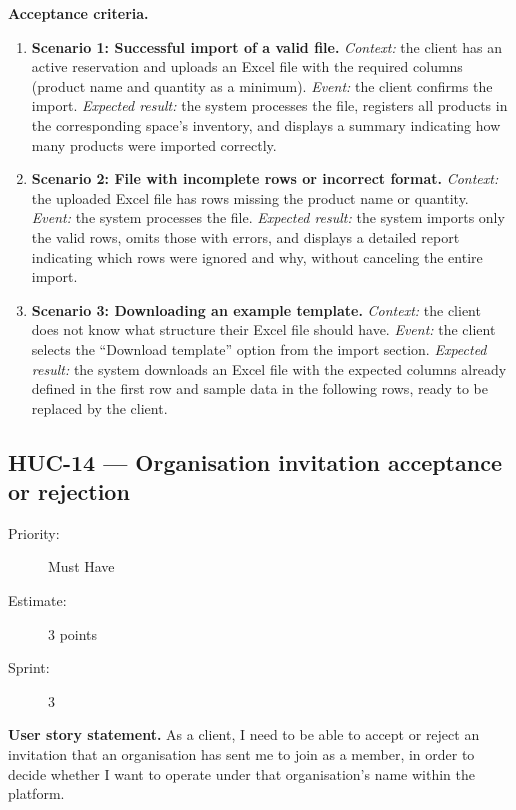 \documentclass[11pt,a4paper,oneside]{report}
\begin{document}
\textbf{Acceptance criteria.}
\begin{enumerate}
\item \textbf{Scenario 1: Successful import of a valid file.} \emph{Context:} the client has an active reservation and uploads an Excel file with the required columns (product name and quantity as a minimum). \emph{Event:} the client confirms the import. \emph{Expected result:} the system processes the file, registers all products in the corresponding space's inventory, and displays a summary indicating how many products were imported correctly.
\item \textbf{Scenario 2: File with incomplete rows or incorrect format.} \emph{Context:} the uploaded Excel file has rows missing the product name or quantity. \emph{Event:} the system processes the file. \emph{Expected result:} the system imports only the valid rows, omits those with errors, and displays a detailed report indicating which rows were ignored and why, without canceling the entire import.
\item \textbf{Scenario 3: Downloading an example template.} \emph{Context:} the client does not know what structure their Excel file should have. \emph{Event:} the client selects the ``Download template'' option from the import section. \emph{Expected result:} the system downloads an Excel file with the expected columns already defined in the first row and sample data in the following rows, ready to be replaced by the client.
\end{enumerate}

\subsection{HUC-14 --- Organisation invitation acceptance or rejection}
\label{req:HUC-14}
\begin{description}
\item[Priority:] Must Have \quad \item[Estimate:] 3 points \quad \item[Sprint:] 3
\end{description}

\textbf{User story statement.} As a client, I need to be able to accept or reject an invitation that an organisation has sent me to join as a member, in order to decide whether I want to operate under that organisation's name within the platform.
\end{document}
